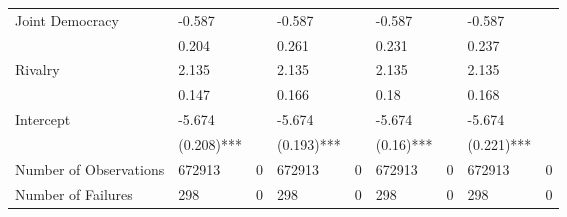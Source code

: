 \begin{table}[ht]
\begin{tabular}{lllllllll}
  Joint Democracy & -0.587 &  & -0.587 &  & -0.587 &  & -0.587 &  \\ 
   & 0.204 &  & 0.261 &  & 0.231 &  & 0.237 &  \\ 
  Rivalry & 2.135 &  & 2.135 &  & 2.135 &  & 2.135 &  \\ 
   & 0.147 &  & 0.166 &  & 0.18 &  & 0.168 &  \\ 
  Intercept & -5.674 &  & -5.674 &  & -5.674 &  & -5.674 &  \\ 
   & (0.208)*** &  & (0.193)*** &  & (0.16)*** &  & (0.221)*** &  \\ 
  Number of Observations & 672913 & 0 & 672913 & 0 & 672913 & 0 & 672913 & 0 \\ 
  Number of Failures & 298 & 0 & 298 & 0 & 298 & 0 & 298 & 0 \\ 
   \bottomrule
\end{tabular}
\end{table}
